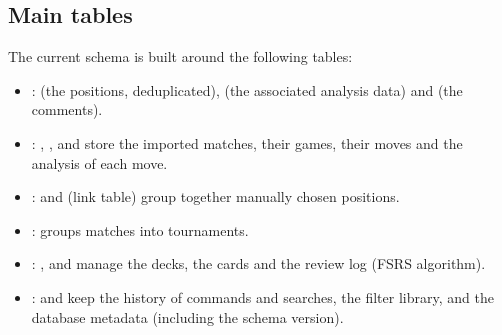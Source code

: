 \documentclass[letterpaper,10pt,english]{sphinxmanual}
\begin{document}
\subsection{Main tables}
\label{\detokenize{annexe_db_scheme:principales-tables}}
\sphinxAtStartPar
The current schema is built around the following tables:
\begin{itemize}
\item {} 
\sphinxAtStartPar
{}:  (the positions, deduplicated),  (the associated analysis data) and  (the comments).

\item {} 
\sphinxAtStartPar
{}: , ,  and  store the imported matches, their games, their moves and the analysis of each move.

\item {} 
\sphinxAtStartPar
{}:  and  (link table) group together manually chosen positions.

\item {} 
\sphinxAtStartPar
{}:  groups matches into tournaments.

\item {} 
\sphinxAtStartPar
{}: ,  and  manage the decks, the cards and the review log (FSRS algorithm).

\item {} 
\sphinxAtStartPar
{}:  and  keep the history of commands and searches,  the filter library, and  the database metadata (including the schema version).

\end{itemize}
\end{document}
